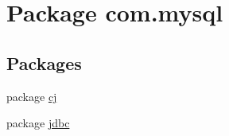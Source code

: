 \hypertarget{namespacecom_1_1mysql}{}\section{Package com.\+mysql}
\label{namespacecom_1_1mysql}
\subsection*{Packages}
\begin{DoxyCompactItemize}
\item 
package \mbox{\hyperlink{namespacecom_1_1mysql_1_1cj}{cj}}
\item 
package \mbox{\hyperlink{namespacecom_1_1mysql_1_1jdbc}{jdbc}}
\end{DoxyCompactItemize}
